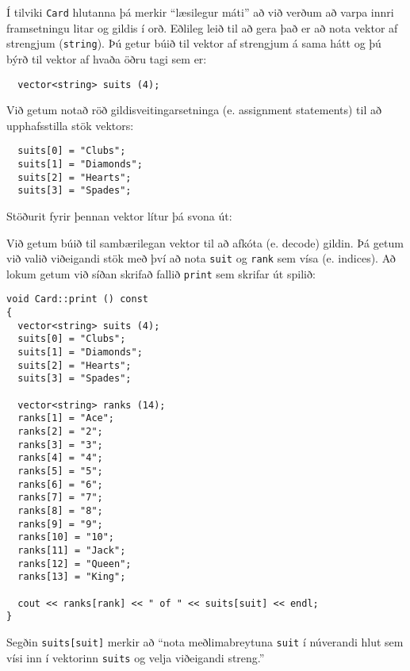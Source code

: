 
Í tilviki {\tt Card} hlutanna þá merkir ``læsilegur máti'' að við verðum að varpa innri framsetningu litar og gildis í orð.
Eðlileg leið til að gera það er að nota vektor af strengjum ({\tt string}).
Þú getur búið til vektor af strengjum á sama hátt og þú býrð til vektor af hvaða öðru tagi sem er:

\begin{verbatim}
  vector<string> suits (4);
\end{verbatim}
%

Við getum notað röð gildisveitingarsetninga (e. assignment statements) til að upphafsstilla stök vektors:

\begin{verbatim}
  suits[0] = "Clubs";
  suits[1] = "Diamonds";
  suits[2] = "Hearts";
  suits[3] = "Spades";
\end{verbatim}
%
Stöðurit fyrir þennan vektor lítur þá svona út: 


\vspace{0.1in}
\centerline{}
\vspace{0.1in}

Við getum búið til sambærilegan vektor til að afkóta (e. decode) gildin.
Þá getum við valið viðeigandi stök með því að nota {\tt suit} og {\tt rank} sem vísa (e. indices).
Að lokum getum við síðan skrifað fallið {\tt print} sem skrifar út spilið:

\begin{verbatim}
void Card::print () const
{
  vector<string> suits (4);
  suits[0] = "Clubs";
  suits[1] = "Diamonds";
  suits[2] = "Hearts";
  suits[3] = "Spades";

  vector<string> ranks (14);
  ranks[1] = "Ace";
  ranks[2] = "2";
  ranks[3] = "3";
  ranks[4] = "4";
  ranks[5] = "5";
  ranks[6] = "6";
  ranks[7] = "7";
  ranks[8] = "8";
  ranks[9] = "9";
  ranks[10] = "10";
  ranks[11] = "Jack";
  ranks[12] = "Queen";
  ranks[13] = "King";

  cout << ranks[rank] << " of " << suits[suit] << endl;
}
\end{verbatim}
%
Segðin {\tt suits[suit]} merkir að ``nota meðlimabreytuna {\tt suit} í núverandi hlut sem vísi inn í vektorinn {\tt suits}
og velja viðeigandi streng.''


